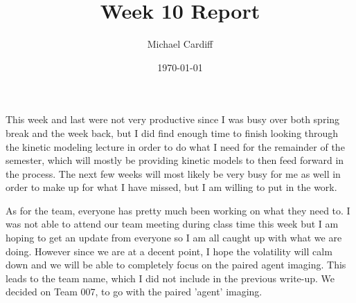 \documentclass[12pt]{article}
\title{Week 10 Report}
\author{Michael Cardiff}
\date{\today}
\begin{document}
\maketitle
This week and last were not very productive since I was busy over both spring break and the week back, but I did find enough time to finish looking through the kinetic modeling lecture in order to do what I need for the remainder of the semester, which will mostly be providing kinetic models to then feed forward in the process. The next few weeks will most likely be very busy for me as well in order to make up for what I have missed, but I am willing to put in the work.

As for the team, everyone has pretty much been working on what they need to. I was not able to attend our team meeting during class time this week but I am hoping to get an update from everyone so I am all caught up with what we are doing. However since we are at a decent point, I hope the volatility will calm down and we will be able to completely focus on the paired agent imaging. This leads to the team name, which I did not include in the previous write-up. We decided on Team 007, to go with the paired 'agent' imaging.
\end{document}
